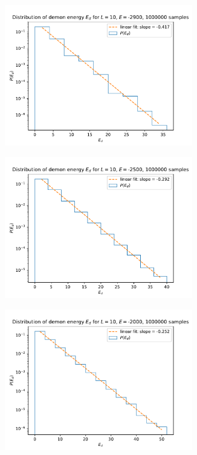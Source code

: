 \documentclass[11pt,a4paper]{article}
\begin{document}
\begin{figure}[b]
	\centering
	\begin{subfigure}{.5\textwidth}
		\centering
		\includegraphics[width=0.9\textwidth]{E_d_L10_E2900.pdf}
	\end{subfigure}%
	\begin{subfigure}{.5\textwidth}
		\centering
		\includegraphics[width=0.9\textwidth]{E_d_L10_E2500.pdf}
	\end{subfigure}
	\begin{subfigure}{.5\textwidth}
		\centering
		\includegraphics[width=0.9\textwidth]{E_d_L10_E2000.pdf}

\end{subfigure}
\end{figure}
\end{document}
